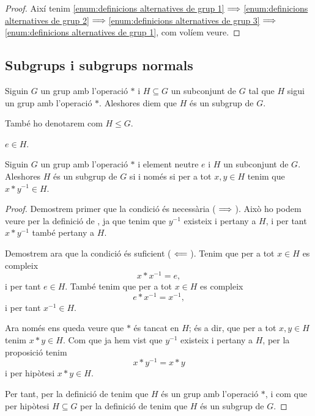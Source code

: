 \documentclass[../Apunts.tex]{subfiles}
\begin{document}
\begin{theorem}
\begin{proof}
			Així tenim \eqref{enum:definicions alternatives de grup 1}\(\implies\)\eqref{enum:definicions alternatives de grup 2}\(\implies\)\eqref{enum:definicions alternatives de grup 3}\(\implies\)\eqref{enum:definicions alternatives de grup 1}, com volíem veure.
		\end{proof}
	\end{theorem}
	\subsection{Subgrups i subgrups normals}
	\begin{definition}[Subgrup]
		\label{def:subgrup}
		Siguin \(G\) un grup amb l'operació \(\ast\) i \(H\subseteq G\) un subconjunt de \(G\) tal que \(H\) sigui un grup amb l'operació \(\ast\). Aleshores diem que \(H\) és un subgrup de \(G\).
		
		També ho denotarem com \(H\leq G\).
	\end{definition}
	\begin{observation}
		\label{obs:l'element neutre d'un grup pertany als subgrups}
		\(e\in H\).
	\end{observation}
	\begin{proposition}
		\label{prop:condició equivalent a subgrup}
		Siguin \(G\) un grup amb l'operació \(\ast\) i element neutre \(e\) i \(H\) un subconjunt de \(G\). Aleshores \(H\) és un subgrup de \(G\) si i només si per a tot \(x,y\in H\) tenim que \(x\ast y^{-1}\in H\).
		\begin{proof}
			Demostrem primer que la condició és necessària (\(\implies\)). Això ho podem veure per la definició de , ja que tenim que \(y^{-1}\) existeix i pertany a \(H\), i per tant \(x\ast y^{-1}\) també pertany a \(H\).
			
			Demostrem ara que la condició és suficient (\(\impliedby\)). Tenim que per a tot \(x\in H\) es compleix
			\[x\ast x^{-1}=e,\]
			i per tant \(e\in H\). També tenim que per a tot \(x\in H\) es compleix
			\[e\ast x^{-1}=x^{-1},\]
			i per tant \(x^{-1}\in H\).
			
			Ara només ens queda veure que \(\ast\) és tancat en \(H\); és a dir, que per a tot \(x,y\in H\) tenim \(x\ast y\in H\). Com que ja hem vist que \(y^{-1}\) existeix i pertany a \(H\), per la proposició  tenim
			\[x\ast y^{-1}=x\ast y\]
			i per hipòtesi \(x\ast y\in H\).
			
			Per tant, per la definició de  tenim que \(H\) és un grup amb l'operació \(\ast\), i com que per hipòtesi \(H\subseteq G\) per la definició de  tenim que \(H\) és un subgrup de \(G\).
		\end{proof}
	\end{proposition}
\end{document}
